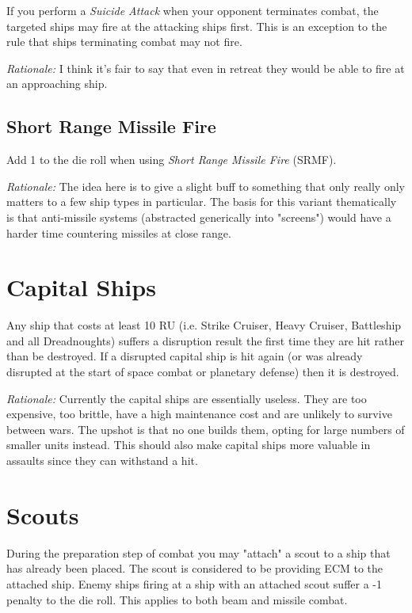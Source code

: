 \documentclass[a4paper,11pt]{article}
\begin{document}
If you perform a \textit{Suicide Attack} when your opponent terminates combat, the targeted ships may fire at the attacking ships first. This is an exception to the rule that ships terminating combat may not fire.

\textit{Rationale:} I think it's fair to say that even in retreat they would be able to fire at an approaching ship.

\subsection{Short Range Missile Fire}

Add 1 to the die roll when using \textit{Short Range Missile Fire} (SRMF).

\textit{Rationale:} The idea here is to give a slight buff to something that only really only matters to a few ship types in particular. The basis for this variant thematically is that anti-missile systems (abstracted generically into "screens") would have a harder time countering missiles at close range.

\section{Capital Ships}

Any ship that costs at least 10 RU (i.e. Strike Cruiser, Heavy Cruiser, Battleship and all Dreadnoughts) suffers a disruption result the first time they are hit rather than be destroyed. If a disrupted capital ship is hit again (or was already disrupted at the start of space combat or planetary defense) then it is destroyed.

\textit{Rationale:} Currently the capital ships are essentially useless. They are too expensive, too brittle, have a high maintenance cost and are unlikely to survive between wars. The upshot is that no one builds them, opting for large numbers of smaller units instead. This should also make capital ships more valuable in assaults since they can withstand a hit.

\section{Scouts}

During the preparation step of combat you may "attach" a scout to a ship that has already been placed. The scout is considered to be providing ECM to the attached ship. Enemy ships firing at a ship with an attached scout suffer a -1 penalty to the die roll. This applies to both beam and missile combat.
\end{document}
